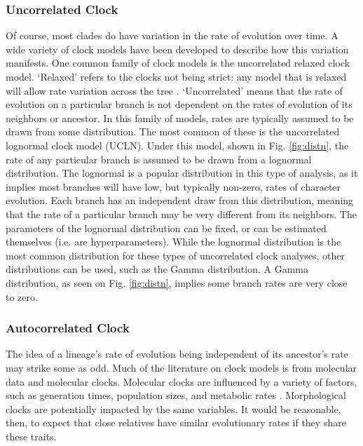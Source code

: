 \subsubsection{Uncorrelated Clock}
Of course, most clades do have variation in the rate of evolution over time. 
A wide variety of clock models have been developed to describe how this variation manifests.
One common family of clock models is the uncorrelated relaxed clock model.
`Relaxed' refers to the clocks not being strict: any model that is relaxed will allow rate variation across the tree \citep{Drummond2006, Drummond2007}.
`Uncorrelated' means that the rate of evolution on a particular branch is not dependent on the rates of evolution of its neighbors or ancestor.
In this family of models, rates are typically assumed to be drawn from some distribution.
The most common of these is the uncorrelated lognormal clock model (UCLN).
Under this model, shown in Fig. \ref{fig:distn}, the rate of any particular branch is assumed to be drawn from a lognormal distribution.
The lognormal is a popular distribution in this type of analysis, as it implies most branches will have low, but typically non-zero, rates of character evolution. 
Each branch has an independent draw from this distribution, meaning that the rate of a particular branch may be very different from its neighbors.
The parameters of the lognormal distribution can be fixed, or can be estimated themselves (i.e. are hyperparameters).
While the lognormal distribution is the most common distribution for these types of uncorrelated clock analyses, other distributions can be used, such as the Gamma distribution.
A Gamma distribution, as seen on Fig. \ref{fig:distn}, implies some branch rates are very close to zero.



\subsubsection{Autocorrelated Clock}
The idea of %
a lineage's rate of evolution being independent of its ancestor's rate may strike some as odd. 
Much of the literature on clock models is from molecular data and molecular clocks.
Molecular clocks are influenced by a variety of factors, such as generation times, population sizes, and metabolic rates \citep{bromham1996, gaut1992}.
Morphological clocks are potentially impacted by the same variables. %
It would be reasonable, then, to expect that close relatives have similar evolutionary rates if they share these traits.

